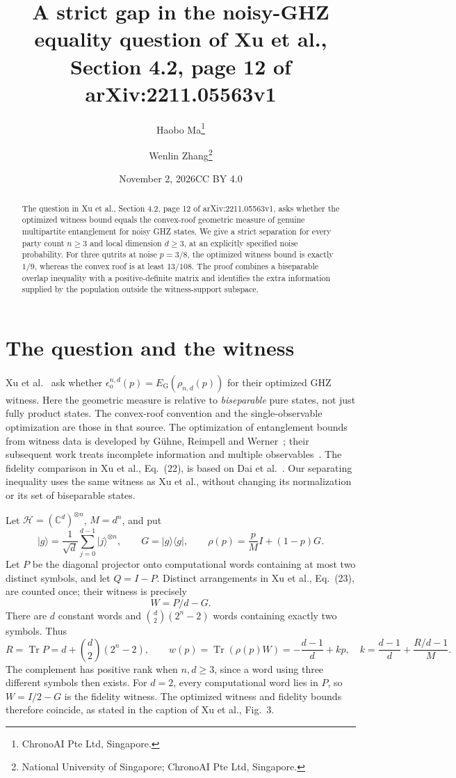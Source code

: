 \documentclass[11pt]{article}
\title{A strict gap in the noisy-GHZ equality question of Xu et al.,\protect\\
Section 4.2, page 12 of arXiv:2211.05563v1}
\author{Haobo Ma\thanks{ChronoAI Pte Ltd, Singapore.}\and
Wenlin Zhang\thanks{National University of Singapore; ChronoAI Pte Ltd, Singapore.}}
\date{November 2, 2026\quad\textnormal{CC BY 4.0}}
\newcommand{\tr}{\operatorname{Tr}}
\newcommand{\ket}[1]{\lvert #1\rangle}
\newcommand{\bra}[1]{\langle #1\rvert}
\newcommand{\EG}{E_{\mathrm G}}
\newcommand{\eps}{\epsilon_{\mathrm o}}
\begin{document}
\maketitle
\begin{abstract}
The question in Xu et al., Section 4.2, page 12 of arXiv:2211.05563v1,
asks whether the optimized witness bound equals the convex-roof geometric
measure of genuine multipartite entanglement for noisy GHZ states.
We give a strict separation for every party count $n\geq3$ and local dimension
$d\geq3$, at an explicitly specified noise probability.
For three qutrits at noise $p=3/8$, the optimized witness bound is exactly
$1/9$, whereas the convex roof is at least $13/108$.
The proof combines a biseparable overlap inequality with a positive-definite
matrix and identifies the extra information supplied by the population
outside the witness-support subspace.
\end{abstract}

\section{The question and the witness}
Xu et al.\ \cite[Section 4.2, Eqs.~(21)--(26), pp.~11--12]{xu}
ask whether $\eps^{n,d}(p)=\EG(\rho_{n,d}(p))$ for their optimized GHZ witness.
Here the geometric measure is relative to \emph{biseparable} pure states,
not just fully product states. The convex-roof convention and the
single-observable optimization are those in that source.
The optimization of entanglement bounds from witness data is developed
by G\"uhne, Reimpell and Werner\ \cite{guhne}; their subsequent work treats
incomplete information and multiple observables\ \cite[Section II]{incomplete}.
The fidelity comparison in
Xu et al., Eq.~(22), is based on Dai et al.\ \cite{dai}.
Our separating inequality uses the same witness as Xu et al., without
changing its normalization or its set of biseparable states.

Let $\mathcal H=(\mathbb C^d)^{\otimes n}$, $M=d^n$, and put
\[
 \ket g=\frac1{\sqrt d}\sum_{j=0}^{d-1}\ket j^{\otimes n},\qquad
 G=\ket g\bra g,\qquad \rho(p)=\frac pM I+(1-p)G.
\]
Let $P$ be the diagonal projector onto computational words containing at
most two distinct symbols, and let $Q=I-P$. Distinct arrangements in
Xu et al., Eq.~(23), are counted once; their witness is precisely
\begin{equation}\label{eq:W}
 W=P/d-G.
\end{equation}
There are $d$ constant words and $\binom d2(2^n-2)$ words containing exactly
two symbols. Thus
\begin{equation}\label{eq:rank}
 R=\tr P=d+\binom d2(2^n-2),\qquad
 w(p)=\tr(\rho(p)W)=-\frac{d-1}{d}+k p,
 \quad k=\frac{d-1}{d}+\frac{R/d-1}{M}.
\end{equation}
The complement has positive rank when $n,d\geq3$, since a word using three
different symbols then exists.
For $d=2$, every computational word lies in $P$, so $W=I/2-G$ is the
fidelity witness. The optimized witness and fidelity bounds therefore
coincide, as stated in the caption of Xu et al., Fig.~3.
\end{document}
